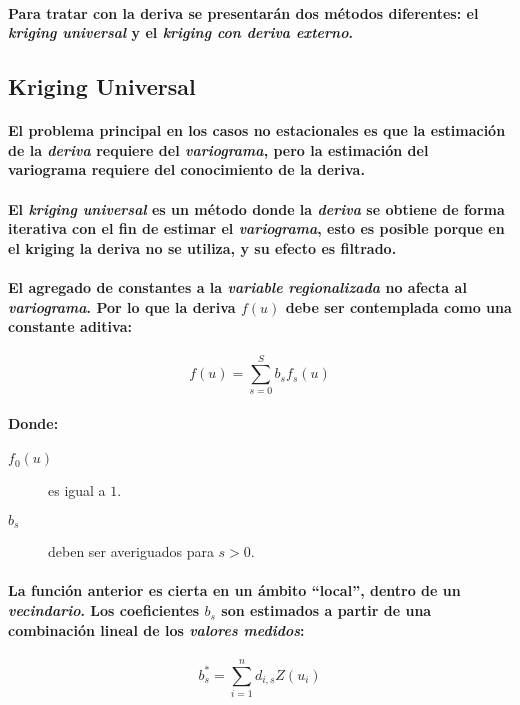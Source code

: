 \paragraph{
Para tratar con la deriva se presentarán dos métodos diferentes: el \emph{kriging universal} y el \emph{kriging con deriva externo}.
}



\subsection{Kriging Universal}
\paragraph{
El problema principal en los casos no estacionales es que la estimación de la \emph{deriva} requiere del \emph{variograma}, pero la estimación del variograma requiere del conocimiento de la deriva.
}
\paragraph{
El \emph{kriging universal} es un método donde la \emph{deriva} se obtiene de forma iterativa con el fin de estimar el \emph{variograma}, esto es posible porque en el kriging la deriva no se utiliza, y su efecto es filtrado.
}
\paragraph{
El agregado de constantes a la \emph{variable regionalizada} no afecta al \emph{variograma}. Por lo que la deriva $f(u)$ debe ser contemplada como una constante aditiva:
}
\begin{equation}
\label{eq:FormaGeneralDeLaDeriva}
f(u) = \sum_{s=0}^S b_s f_s(u)
\end{equation}
\paragraph{
Donde:
}
\begin{description}
\item[$f_0(u)$] es igual a $1$.
\item[$b_s$] deben ser averiguados para $s>0$.
\end{description}
\paragraph{
La función anterior es cierta en un ámbito ``local'', dentro de un \emph{vecindario}. Los coeficientes $b_s$ son estimados a partir de una combinación lineal de los \emph{valores medidos}:
}
\begin{equation}
b_s^* = \sum_{i=1}^n d_{i,s} Z(u_i)
\end{equation}
